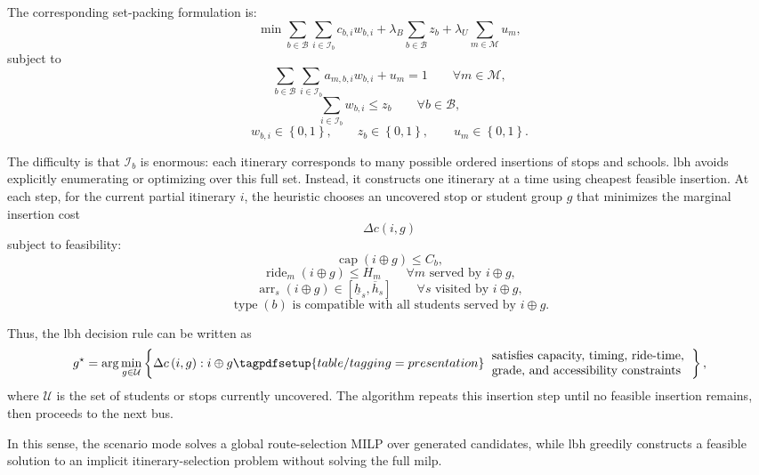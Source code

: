 The corresponding set-packing formulation is:
\[
\min
\sum_{b\in\mathcal{B}}\sum_{i\in\mathcal{I}_b} c_{b,i}w_{b,i}
+ \lambda_B \sum_{b\in\mathcal{B}} z_b
+ \lambda_U \sum_{m\in\mathcal{M}} u_m ,
\]
subject to
\[
\sum_{b\in\mathcal{B}}\sum_{i\in\mathcal{I}_b} a_{m,b,i}w_{b,i} + u_m = 1
\qquad \forall m\in\mathcal{M},
\]
\[
\sum_{i\in\mathcal{I}_b} w_{b,i} \le z_b
\qquad \forall b\in\mathcal{B},
\]
\[
w_{b,i}\in\left\{0,1\right\},
\qquad
z_b\in\left\{0,1\right\},
\qquad
u_m\in\left\{0,1\right\}.
\]

The difficulty is that $\mathcal{I}_b$ is enormous: each itinerary corresponds to many possible ordered insertions of stops and schools. \gls{lbh} avoids explicitly enumerating or optimizing over this full set. Instead, it constructs one itinerary at a time using cheapest feasible insertion. At each step, for the current partial itinerary $i$, the heuristic chooses an uncovered stop or student group $g$ that minimizes the marginal insertion cost
\[
\Delta c\left(i,g\right)
\]
subject to feasibility:
\[
\operatorname{cap}\left(i\oplus g\right) \le C_b,
\]
\[
\operatorname{ride}_m\left(i\oplus g\right) \le H_m
\qquad \forall m \text{ served by } i\oplus g,
\]
\[
\operatorname{arr}_{s}\left(i\oplus g\right) \in \left[\underline{h}_s,\overline{h}_s\right]
\qquad \forall s \text{ visited by } i\oplus g,
\]
\[
\operatorname{type}\left(b\right) \text{ is compatible with all students served by } i\oplus g.
\]

Thus, the \gls{lbh} decision rule can be written as
\[
g^\star
=
\arg\min_{g\in\mathcal{U}}
\left\{
\Delta c\left(i,g\right)
:
i\oplus g {\tagpdfsetup{table/tagging=presentation}\begin{tabular}{l} satisfies capacity, timing, ride-time, \\ grade, and accessibility constraints\end{tabular}} %
\right\},
\]
where $\mathcal{U}$ is the set of students or stops currently uncovered. The algorithm repeats this insertion step until no feasible insertion remains, then proceeds to the next bus.

In this sense, the scenario mode solves a global route-selection MILP over generated candidates, while \gls{lbh} greedily constructs a feasible solution to an implicit itinerary-selection problem without solving the full \gls{milp}.
